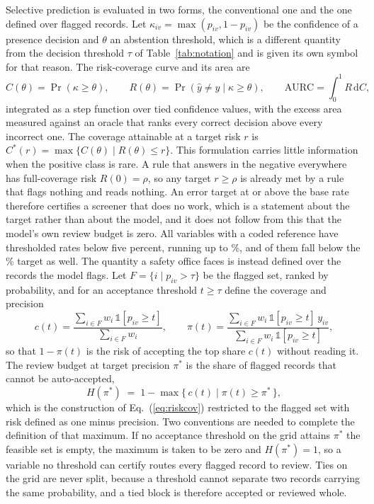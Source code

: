 Selective prediction is evaluated in two forms, the conventional one and the one defined
over flagged records. Let $\kappa_{iv} = \max(p_{iv}, 1 - p_{iv})$ be the confidence of a
presence decision and $\theta$ an abstention threshold, which is a different quantity from the
decision threshold $\tau$ of Table~\ref{tab:notation} and is given its own symbol for that
reason. The risk-coverage curve and its area are
\begin{equation}
C(\theta) = \Pr(\kappa \ge \theta),\qquad
R(\theta) = \Pr(\hat{y} \ne y \mid \kappa \ge \theta),\qquad
\mathrm{AURC} = \int_0^1 R\,\mathrm{d}C,
\label{eq:riskcov}
\end{equation}
integrated as a step function over tied confidence values, with the excess area measured
against an oracle that ranks every correct decision above every incorrect one. The coverage
attainable at a target risk $r$ is $C^{*}(r) = \max\{C(\theta) \mid R(\theta) \le r\}$. This
formulation carries little information when the positive class is rare. A rule that answers in
the negative everywhere has full-coverage risk $R(0) = \rho$, so any target $r \ge \rho$ is
already met by a rule that flags nothing and reads nothing. An error target at or above the
base rate therefore certifies a screener that does no work, which is a statement about the
target rather than about the model, and it does not follow from this that the model's own
review budget is zero. All \NPrevalenceVars{} variables with a coded reference have
thresholded rates below five percent, running up to \PrevalenceMaxPct\%, and \NBelowOnePct{}
of them fall below the \RiskTargetOne\% target as well. The quantity a safety office faces is instead defined over the records the
model flags. Let $F = \{i \mid p_{iv} > \tau\}$ be the flagged set, ranked by probability, and
for an acceptance threshold $t \ge \tau$ define the coverage and precision
\begin{equation}
c(t) = \frac{\sum_{i \in F} w_i\,\mathbb{1}[p_{iv} \ge t]}{\sum_{i \in F} w_i},\qquad
\pi(t) = \frac{\sum_{i \in F} w_i\,\mathbb{1}[p_{iv} \ge t]\,y_{iv}}{\sum_{i \in F} w_i\,\mathbb{1}[p_{iv} \ge t]},
\label{eq:prec}
\end{equation}
so that $1 - \pi(t)$ is the risk of accepting the top share $c(t)$ without reading it. The
review budget at target precision $\pi^{*}$ is the share of flagged records that cannot be
auto-accepted,
\begin{equation}
H(\pi^{*}) \;=\; 1 - \max\bigl\{\, c(t) \mid \pi(t) \ge \pi^{*} \,\bigr\},
\label{eq:budget}
\end{equation}
which is the construction of Eq.~(\ref{eq:riskcov}) restricted to the flagged set with risk
defined as one minus precision. Two conventions are needed to complete the definition of that maximum. If no acceptance
threshold on the grid attains $\pi^{*}$ the feasible set is empty, the maximum is taken to be
zero and $H(\pi^{*}) = 1$, so a variable no threshold can certify routes every flagged record
to review. Ties on the grid are never split, because a threshold cannot separate two records
carrying the same probability, and a tied block is therefore accepted or reviewed whole.

